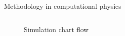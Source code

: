 		 

\begin{frame}{Methodology in computational physics}
	\begin{scriptsize}
		\begin{columns}%
			\column{6cm}
			\begin{figure}
        \centering
        \scalebox{0.65}{}
        \caption{Simulation chart flow}
			\end{figure}
			
			\column{6cm}
      \tableofcontents
      
		\end{columns}
	\end{scriptsize}	
\end{frame}
	
	



